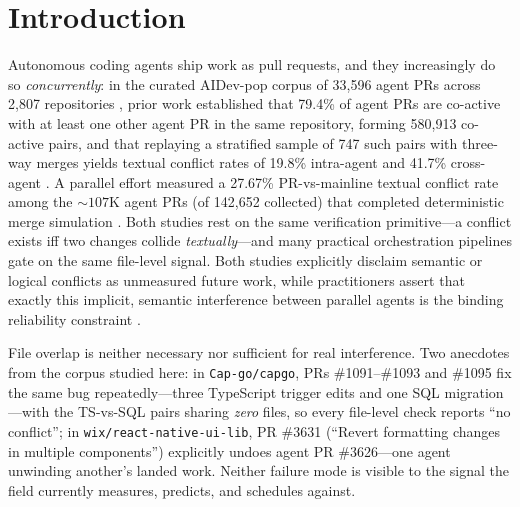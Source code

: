 \documentclass{article}
\begin{document}
\section{Introduction}
\label{sec:intro}

Autonomous coding agents ship work as pull requests, and they increasingly do so \emph{concurrently}: in the curated AIDev-pop corpus of 33{,}596 agent PRs across 2{,}807 repositories \citep{li2026aidev,li2025rise}, prior work established that 79.4\% of agent PRs are co-active with at least one other agent PR in the same repository, forming 580{,}913 co-active pairs, and that replaying a stratified sample of 747 such pairs with three-way merges yields textual conflict rates of 19.8\% intra-agent and 41.7\% cross-agent \citep{xu2026agentprs}. %
A parallel effort measured a 27.67\% PR-vs-mainline textual conflict rate among the ${\sim}107$K agent PRs (of 142{,}652 collected) that completed deterministic merge simulation \citep{agenticflict}. %
Both studies rest on the same verification primitive---a conflict exists iff two changes collide \emph{textually}---and many practical orchestration pipelines gate on the same file-level signal. Both studies explicitly disclaim semantic or logical conflicts as unmeasured future work, while practitioners assert that exactly this implicit, semantic interference between parallel agents is the binding reliability constraint \citep{cognition2025,coagent}.

File overlap is neither necessary nor sufficient for real interference. Two anecdotes from the corpus studied here: in \texttt{Cap-go/capgo}, PRs \#1091--\#1093 and \#1095 fix the same bug repeatedly---three TypeScript trigger edits and one SQL migration---with the TS-vs-SQL pairs sharing \emph{zero} files, so every file-level check reports ``no conflict''; %
in \texttt{wix/react-native-ui-lib}, PR \#3631 (``Revert formatting changes in multiple components'') explicitly undoes agent PR \#3626---one agent unwinding another's landed work. %
Neither failure mode is visible to the signal the field currently measures, predicts, and schedules against.
\end{document}
